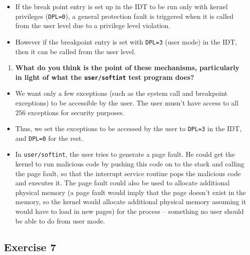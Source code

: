 \documentclass[]{article}
\begin{document}
\begin{itemize}
\itemsep1pt\parskip0pt
\item
  If the break point entry is set up in the IDT to be run only with
  kernel privileges (\texttt{DPL=0}), a general protection fault is
  triggered when it is called from the user level due to a privilege
  level violation.
\item
  However if the breakpoint entry is set with \texttt{DPL=3} (user mode)
  in the IDT, then it can be called from the user level.
\end{itemize}

\begin{enumerate}
\def\labelenumi{\arabic{enumi}.}
\setcounter{enumi}{3}
\itemsep1pt\parskip0pt
\item
  \textbf{What do you think is the point of these mechanisms,
  particularly in light of what the \texttt{user/softint} test program
  does?}
\end{enumerate}

\begin{itemize}
\itemsep1pt\parskip0pt
\item
  We want only a few exceptions (such as the system call and breakpoint
  exceptions) to be accessible by the user. The user musn't have access
  to all 256 exceptions for security purposes.
\item
  Thus, we set the exceptions to be accessed by the user to
  \texttt{DPL=3} in the IDT, and \texttt{DPL=0} for the rest.
\item
  In \texttt{user/softint}, the user tries to generate a page fault. He
  could get the kernel to run malicious code by pushing this code on to
  the stack and calling the page fault, so that the interrupt service
  routine pops the malicious code and executes it. The page fault could
  also be used to allocate additional physical memory (a page fault
  would imply that the page doesn't exist in the memory, so the kernel
  would allocate additional physical memory assuming it would have to
  load in new pages) for the process -- something no user should be able
  to do from user mode.
\end{itemize}

\subsection{Exercise 7}
\end{document}
